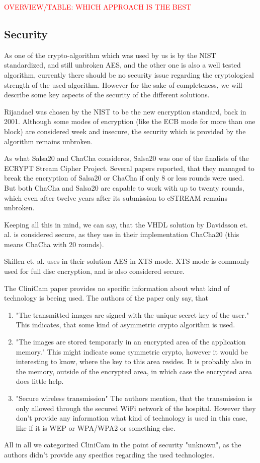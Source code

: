 \documentclass[12pt,a4paper,titlepage,oneside]{scrartcl}
\newcommand\todo[1]{\textcolor{red}{#1}}
\begin{document}
\todo{OVERVIEW/TABLE: WHICH APPROACH IS THE BEST}

\subsection{Security}
As one of the crypto-algorithm which was used by us is by the NIST standardized, and still unbroken AES, and the other one is also a well tested algorithm, currently there should be no security issue regarding the cryptological strength of the used algorithm.
However for the sake of completeness, we will describe some key aspects of the security of the different solutions.

Rijandael was chosen by the NIST to be the new encryption standard, back in 2001.
Although some modes of encryption (like the ECB mode for more than one block) are considered week and insecure, the security which is provided by the algorithm remains unbroken.

As what Salsa20 and ChaCha consideres, Salsa20 was one of the finalists of the ECRYPT Stream Cipher Project. \cite{bernstein2008salsa20}
Several papers reported, that they managed to break the encryption of Salsa20 or ChaCha if only 8 or less rounds were used. \cite{aumasson2008new, crowley2006truncated, fischer2006non, tsunoo2007differential}
But both ChaCha and Salsa20 are capable to work with up to twenty rounds, which even after twelve years after its submission to eSTREAM remains unbroken.

Keeping all this in mind, we can say, that the VHDL solution by Davidsson et. al. is considered secure, as they use in their implementation ChaCha20 (this means ChaCha with 20 rounds). \cite{Davidsson2016}

Skillen et. al. uses in their solution AES in XTS mode.
XTS mode is commonly used for full disc encryption, and is also considered secure. \cite{alomari2014implementation}

The CliniCam paper provides no specific information about what kind of technology is beeing used.
The authors of the paper only say, that
\begin{enumerate}[label={\alph*}]
  \item "The transmitted images are signed with the unique secret key of the user."
    This indicates, that some kind of asymmetric crypto algorithm is used.
  \item "The images are stored temporarly in an encrypted area of the application memory."
    This might indicate some symmetric crypto, however it would be interesting to know, where the key to this area resides.
    It is probably also in the memory, outside of the encrypted area, in which case the encrypted area does little help.
  \item "Secure wireless transmission"
    The authors mention, that the transmission is only allowed through the secured WiFi network of the hospital.
    However they don't provide any information what kind of technology is used in this case, like if it is WEP or WPA/WPA2 or something else.
\end{enumerate}
All in all we categorized CliniCam in the point of security "unknown", as the authors didn't provide any specifics regarding the used technologies. \cite{pmid25565678}
\end{document}
